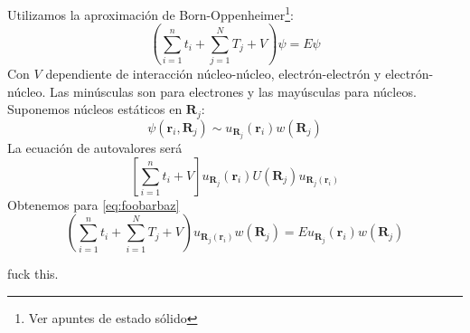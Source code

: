 Utilizamos la aproximación de Born-Oppenheimer\footnote{Ver apuntes de
estado sólido}:
\begin{equation}
  \left( \sum_{i=1}^n t_i + \sum_{j=1}^N T_j + V\right) \psi = E \psi
  \label{eq:foobarbaz}
\end{equation}
Con $V$ dependiente de interacción núcleo-núcleo, electrón-electrón
y electrón-núcleo. Las minúsculas son para electrones y las mayúsculas
para núcleos. Suponemos núcleos estáticos en $\mathbf{R}_j$:
\begin{equation}
  \psi(\mathbf{r}_i,\mathbf{R}_j) \sim u_{\mathbf{R}_j}(\mathbf{r}_i)w(\mathbf{R}_j)
\end{equation}
La ecuación de autovalores será
\begin{equation}
  \left[ \sum_{i=1}^n t_i + V \right] u_{\mathbf{R}_j}(\mathbf{r}_i)
  U(\mathbf{R}_j) u_{\mathbf{R}_j(\mathbf{r}_i)}
\end{equation}
Obtenemos para \eqref{eq:foobarbaz}
\begin{equation}
  \left( \sum_{i=1}^n t_i + \sum_{i=1}^N T_j +V \right)
  u_{\mathbf{R}_j(\mathbf{r}_i)} w(\mathbf{R}_j) = E
  u_{\mathbf{R}_j}(\mathbf{r}_i) w(\mathbf{R}_j)
\end{equation}

fuck this.







